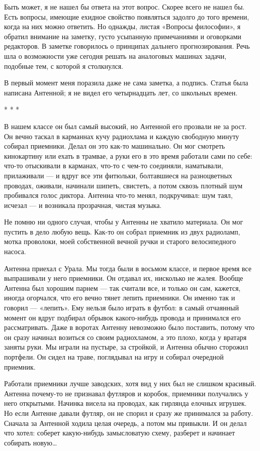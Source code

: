 Быть может, я не нашел бы ответа на этот вопрос. Скорее всего не нашел бы.
Есть вопросы, имеющие ехидное свойство появляться задолго до того времени,
когда на них  можно ответить.  Но однажды, листая  «Вопросы философии»,  я
обратил внимание  на заметку,  густо усыпанную  примечаниями и  оговорками
редакторов. В  заметке говорилось  о принципах  дальнего  прогнозирования.
Речь шла о возможности  уже сегодня решать  на аналоговых машинах  задачи,
подобные тем, с которой я столкнулся.

В первый момент меня поразила даже не сама заметка, а подпись. Статья была
написана Антенной; я не видел его четырнадцать лет, со школьных времен.

* * *

В нашем классе он был самый высокий, но Антенной его прозвали не за  рост.
Он вечно  таскал в  карманнах  кучу радиохлама  и каждую  свободную  минуту
собирал приемники.  Делал  он  это  как-то  машинально.  Он  мог  смотреть
кинокартину или ехать в трамвае, а руки  его в это время работали сами  по
себе: что-то отыскивали в карманах, что-то с чем-то соединяли, наматывали,
прилаживали —  и  вдруг  все эти  фитюльки,  болтавшиеся  на  разноцветных
проводах, оживали, начинали шипеть, свистеть,  а потом сквозь плотный  шум
пробивался голос  диктора. Антенна  что-то менял,  подкручивал: шум  таял,
исчезал — и возникала прозрачная, чистая музыка.

Не помню ни одного  случая, чтобы у Антенны  не хватило материала. Он  мог
пустить в дело любую  вещь. Как-то он собрал  приемник из двух  радиоламп,
мотка проволоки,  моей собственной  вечной ручки  и старого  велосипедного
насоса.

Антенна приехал с Урала.  Мы тогда были в  восьмом классе, и первое  время
все выпрашивали  у него  приемники.  Он отдавал  их, нисколько  не  жалея.
Вообще Антенна был  хорошим парнем  — так считали  все, и  только он  сам,
кажется, иногда огорчался, что его вечно тянет лепить приемники. Он именно
так и  говорил  — «лепить».  Ему  нельзя было  играть  в футбол:  в  самый
отчаянный  момент  он  вдруг  подбирал  обрывок  какого-нибудь  провода  и
принимался его  рассматривать.  Даже  в воротах  Антенну  невозможно  было
поставить, потому что он  сразу начинал возиться  со своим радиохламом,  а
это плохо, когда у вратаря заняты руки. Мы играли на пустыре, за стройкой,
и Антенна обычно сторожил портфели. Он сидел на траве, поглядывал на  игру
и собирал очередной приемник.

Работали приемники  лучше  заводских,  хотя  вид  у  них  был  не  слишком
красивый. Антенна  почему-то не  признавал футляров  и коробок,  приемники
получались у  него открытыми.  Начинка висела  на проводах,  как  гирлянда
елочных игрушек. Но если  Антенне давали футляр, он  не спорил и сразу  же
принимался за работу. Сначала за Антенной ходила целая очередь, а потом мы
привыкли. И он делал что  хотел: соберет какую-нибудь замысловатую  схему,
разберет и начинает собирать новую…

